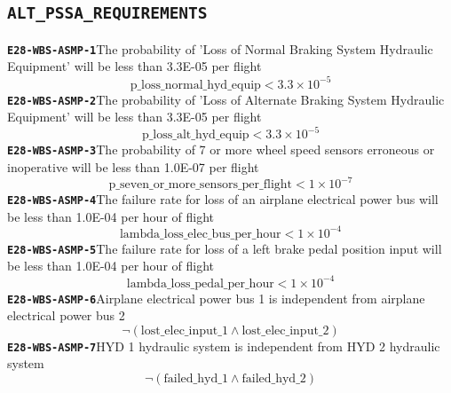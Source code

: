 \documentclass[11pt,a4paper]{article}
\begin{document}
\subsection*{\texttt{ALT\_PSSA\_REQUIREMENTS}}
\noindent\textbf{\texttt{E28-WBS-ASMP-1}}\quad The probability of 'Loss of Normal Braking System Hydraulic Equipment' will be less than 3.3E-05 per flight
\begin{dmath*}
\text{p\_loss\_normal\_hyd\_equip} < 3.3 \times 10^{-5}
\end{dmath*}
\noindent\textbf{\texttt{E28-WBS-ASMP-2}}\quad The probability of 'Loss of Alternate Braking System Hydraulic Equipment' will be less than 3.3E-05 per flight
\begin{dmath*}
\text{p\_loss\_alt\_hyd\_equip} < 3.3 \times 10^{-5}
\end{dmath*}
\noindent\textbf{\texttt{E28-WBS-ASMP-3}}\quad The probability of 7 or more wheel speed sensors erroneous or inoperative will be less than 1.0E-07 per flight
\begin{dmath*}
\text{p\_seven\_or\_more\_sensors\_per\_flight} < 1 \times 10^{-7}
\end{dmath*}
\noindent\textbf{\texttt{E28-WBS-ASMP-4}}\quad The failure rate for loss of an airplane electrical power bus will be less than 1.0E-04 per hour of flight
\begin{dmath*}
\text{lambda\_loss\_elec\_bus\_per\_hour} < 1 \times 10^{-4}
\end{dmath*}
\noindent\textbf{\texttt{E28-WBS-ASMP-5}}\quad The failure rate for loss of a left brake pedal position input will be less than 1.0E-04 per hour of flight
\begin{dmath*}
\text{lambda\_loss\_pedal\_per\_hour} < 1 \times 10^{-4}
\end{dmath*}
\noindent\textbf{\texttt{E28-WBS-ASMP-6}}\quad Airplane electrical power bus 1 is independent from airplane electrical power bus 2
\begin{dmath*}
\neg (\text{lost\_elec\_input\_1} \wedge \text{lost\_elec\_input\_2})
\end{dmath*}
\noindent\textbf{\texttt{E28-WBS-ASMP-7}}\quad HYD 1 hydraulic system is independent from HYD 2 hydraulic system
\begin{dmath*}
\neg (\text{failed\_hyd\_1} \wedge \text{failed\_hyd\_2})
\end{dmath*}
\end{document}
